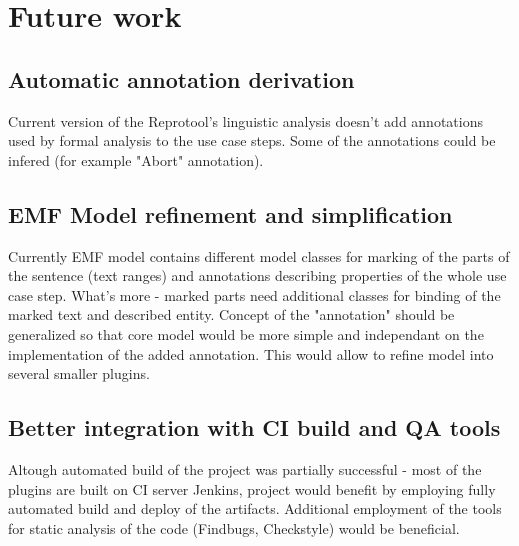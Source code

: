 \section{Future work}

\subsection{Automatic annotation derivation}
Current version of the Reprotool's linguistic analysis doesn't add annotations
used by formal analysis to the use case steps. Some of the annotations could be
infered (for example "Abort" annotation).

\subsection{EMF Model refinement and simplification}
Currently EMF model contains different model classes for marking of the
parts of the sentence (text ranges) and annotations describing properties of
the whole use case step. What's more - marked parts need additional classes
for binding of the marked text and described entity.
Concept of the "annotation" should be generalized so that core model would be
more simple and independant on the implementation of the added annotation.
This would allow to refine model into several smaller plugins.

\subsection{Better integration with CI build and QA tools}
Altough automated build of the project was partially successful - most of the
plugins are built on CI server Jenkins, project would benefit by employing
fully automated build and deploy of the artifacts. Additional employment of the 
tools for static analysis of the code (Findbugs, Checkstyle) would be beneficial. 
